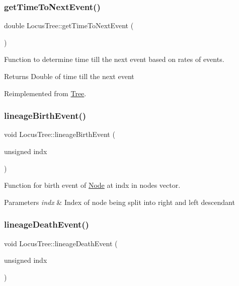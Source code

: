 \subsubsection{\texorpdfstring{getTimeToNextEvent()}{getTimeToNextEvent()}}
{\footnotesize\ttfamily double Locus\+Tree\+::get\+Time\+To\+Next\+Event (\begin{DoxyParamCaption}{ }\end{DoxyParamCaption})\hspace{0.3cm}{\ttfamily [virtual]}}



Function to determine time till the next event based on rates of events. 

\begin{DoxyReturn}{Returns}
Double of time till the next event 
\end{DoxyReturn}


Reimplemented from \mbox{\hyperlink{class_tree}{Tree}}.

\mbox{\label{class_locus_tree_a7753da5011b9c38cf2c6cdcebfd4e2a7}} 
\subsubsection{\texorpdfstring{lineageBirthEvent()}{lineageBirthEvent()}}
{\footnotesize\ttfamily void Locus\+Tree\+::lineage\+Birth\+Event (\begin{DoxyParamCaption}\item[{unsigned}]{indx }\end{DoxyParamCaption})\hspace{0.3cm}{\ttfamily [virtual]}}



Function for birth event of \mbox{\hyperlink{class_node}{Node}} at indx in nodes vector. 


\begin{DoxyParams}{Parameters}
{\em indx} & Index of node being split into right and left descendant \\
\hline
\end{DoxyParams}
\mbox{\label{class_locus_tree_a8016a380d942ecb255e6bfe36275f398}} 
\subsubsection{\texorpdfstring{lineageDeathEvent()}{lineageDeathEvent()}}
{\footnotesize\ttfamily void Locus\+Tree\+::lineage\+Death\+Event (\begin{DoxyParamCaption}\item[{unsigned}]{indx }\end{DoxyParamCaption})\hspace{0.3cm}{\ttfamily [virtual]}}



